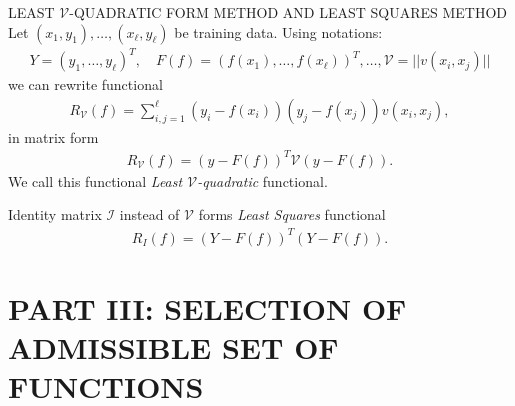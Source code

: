 \documentclass[11pt]{beamer}
\begin{document}
\begin{frame}{LEAST $\mathcal{V}$-QUADRATIC FORM METHOD AND LEAST SQUARES METHOD}
Let $(x_{1}, y_{1}), \ldots, (x_{\ell}, y_{\ell})$ be training data. Using notations:
\begin{align*}
Y = (y_{1}, \ldots, y_{\ell})^{T}, \quad F(f) = (f(x_{1}), \ldots, f(x_{\ell}))^{T}, \ldots, \mathcal{V} = ||v(x_{i}, x_{j})|| 
\end{align*}
we can rewrite functional
\begin{align*}
R_{\mathcal{V}}(f) = \sum_{i,j=1}^{\ell}(y_{i}-f(x_{i}))(y_{j}-f(x_{j}))v(x_{i}, x_{j}),
\end{align*}
in matrix form
\begin{align*}
R_{\mathcal{V}}(f) = (y - F(f))^{T}\mathcal{V}(y - F(f)).
\end{align*}
We call this functional \emph{Least $\mathcal{V}$-quadratic} functional.

Identity matrix $\mathcal{I}$ instead of $\mathcal{V}$ forms \emph{Least Squares} functional
\begin{align*}
R_{I}(f) = (Y - F(f))^{T}(Y - F(f)).
\end{align*}
\end{frame}

\section{PART III: SELECTION OF ADMISSIBLE SET OF FUNCTIONS}
\begin{frame}
{\color{blue}{
\begin{center}
PART III
\end{center}
\begin{center}
SELECTION OF ADMISSIBLE SET OF FUNCTIONS
\end{center}
}}
\end{frame}
\end{document}
